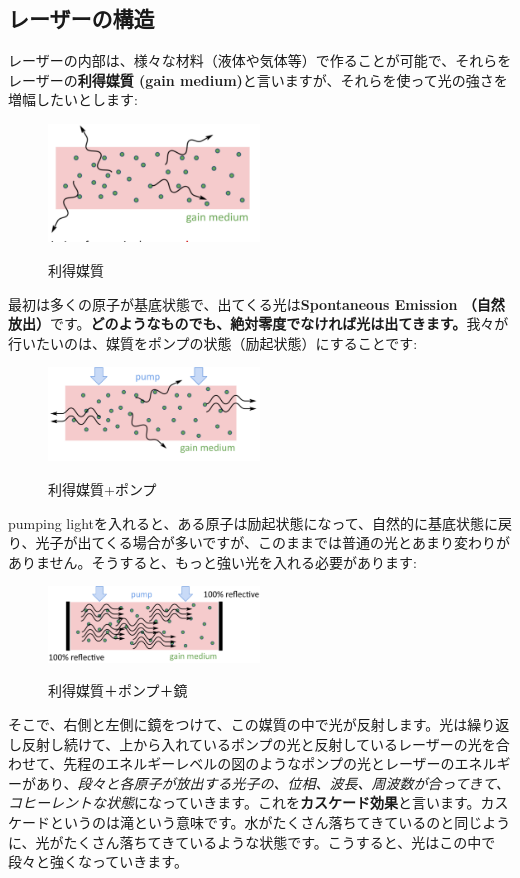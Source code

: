 \subsection{レーザーの構造}

レーザーの内部は、様々な材料（液体や気体等）で作ることが可能で、それらをレーザーの\textbf{利得媒質 (gain medium)}と言いますが、それらを使って光の強さを増幅したいとします:
\begin{figure}[H]
    \centering
    \includegraphics[width=0.5\textwidth]{lesson5/medium_random.pdf}
    \label{図: 1}
    \caption{利得媒質}
\end{figure}
最初は多くの原子が基底状態で、出てくる光は\textbf{Spontaneous Emission （自然放出）}です。\textbf{どのようなものでも、絶対零度でなければ光は出てきます。}我々が行いたいのは、媒質をポンプの状態（励起状態）にすることです:
\begin{figure}[H]
    \centering
    \includegraphics[width=0.5\textwidth]{lesson5/medium_pump.pdf}
    \label{図: 1}
    \caption{利得媒質+ポンプ}
\end{figure}
pumping lightを入れると、ある原子は励起状態になって、自然的に基底状態に戻り、光子が出てくる場合が多いですが、このままでは普通の光とあまり変わりがありません。そうすると、もっと強い光を入れる必要があります:
\begin{figure}[H]
    \centering
    \includegraphics[width=0.5\textwidth]{lesson5/medium_mirrors.pdf}
    \label{図: 1}
    \caption{利得媒質＋ポンプ＋鏡}
\end{figure}
そこで、右側と左側に鏡をつけて、この媒質の中で光が反射します。光は繰り返し反射し続けて、上から入れているポンプの光と反射しているレーザーの光を合わせて、先程のエネルギーレベルの図のようなポンプの光とレーザーのエネルギーがあり、\textit{段々と各原子が放出する光子の、位相、波長、周波数が合ってきて、コヒーレントな状態}になっていきます。これを\textbf{カスケード効果}と言います。カスケードというのは滝という意味です。水がたくさん落ちてきているのと同じように、光がたくさん落ちてきているような状態です。こうすると、光はこの中で段々と強くなっていきます。

